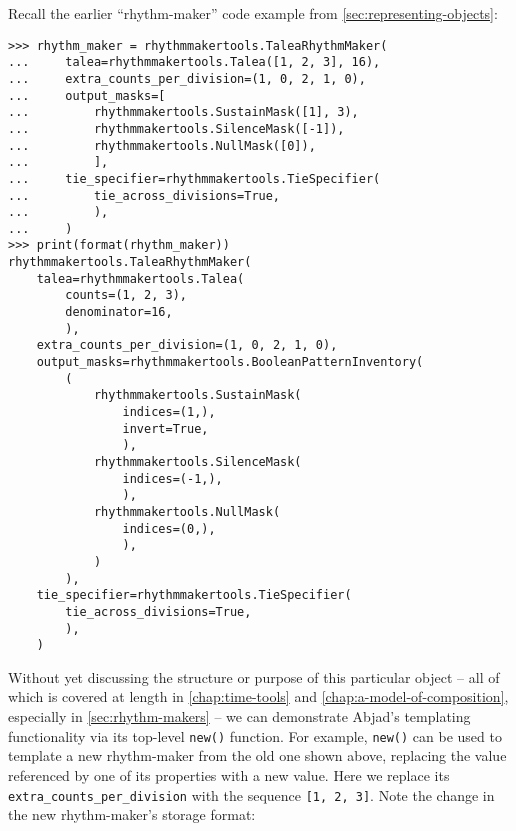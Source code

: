 Recall the earlier \enquote{rhythm-maker} code example from
\autoref{sec:representing-objects}:

\begin{comment}
<abjad>
rhythm_maker = rhythmmakertools.TaleaRhythmMaker(
    talea=rhythmmakertools.Talea([1, 2, 3], 16),
    extra_counts_per_division=(1, 0, 2, 1, 0),
    output_masks=[
        rhythmmakertools.SustainMask([1], 3),
        rhythmmakertools.SilenceMask([-1]),
        rhythmmakertools.NullMask([0]),
        ],
    tie_specifier=rhythmmakertools.TieSpecifier(
        tie_across_divisions=True,
        ),
    )
print(format(rhythm_maker))
</abjad>
\end{comment}

\begin{abjadbookoutput}
\begin{singlespacing}
\vspace{-0.5\baselineskip}
\begin{verbatim}
>>> rhythm_maker = rhythmmakertools.TaleaRhythmMaker(
...     talea=rhythmmakertools.Talea([1, 2, 3], 16),
...     extra_counts_per_division=(1, 0, 2, 1, 0),
...     output_masks=[
...         rhythmmakertools.SustainMask([1], 3),
...         rhythmmakertools.SilenceMask([-1]),
...         rhythmmakertools.NullMask([0]),
...         ],
...     tie_specifier=rhythmmakertools.TieSpecifier(
...         tie_across_divisions=True,
...         ),
...     )
>>> print(format(rhythm_maker))
rhythmmakertools.TaleaRhythmMaker(
    talea=rhythmmakertools.Talea(
        counts=(1, 2, 3),
        denominator=16,
        ),
    extra_counts_per_division=(1, 0, 2, 1, 0),
    output_masks=rhythmmakertools.BooleanPatternInventory(
        (
            rhythmmakertools.SustainMask(
                indices=(1,),
                invert=True,
                ),
            rhythmmakertools.SilenceMask(
                indices=(-1,),
                ),
            rhythmmakertools.NullMask(
                indices=(0,),
                ),
            )
        ),
    tie_specifier=rhythmmakertools.TieSpecifier(
        tie_across_divisions=True,
        ),
    )
\end{verbatim}
\end{singlespacing}
\end{abjadbookoutput}

\noindent Without yet discussing the structure or purpose of this particular
object -- all of which is covered at length in \autoref{chap:time-tools} and
\autoref{chap:a-model-of-composition}, especially in
\autoref{sec:rhythm-makers} -- we can demonstrate Abjad's templating
functionality via its top-level \texttt{new()} function. For example,
\texttt{new()} can be used to template a new rhythm-maker from the old one shown
above, replacing the value referenced by one of its properties with a new
value. Here we replace its \texttt{extra\_counts\_per\_division} with the
sequence \texttt{[1, 2, 3]}. Note the change in the new rhythm-maker's storage
format:


